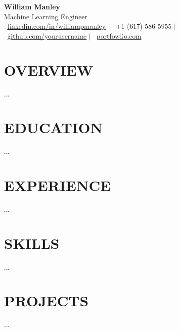 \documentclass[11pt,a4paper]{article}
\begin{document}
\begin{center}
  {\Huge \textbf{William Manley}} \\[0.2cm]
  {\large Machine Learning Engineer} \\[0.3cm]
  \faLinkedin\ \href{https://linkedin.com/in/williampmanley
  }{linkedin.com/in/williampmanley} $|$
  \faPhone\ +1 (617) 586-5955 $|$
  \faGithub\ \href{https://github.com/yourusername}{github.com/yourusername} $|$
  \faGlobe\ \href{https://trained-by-will.com}{portfowlio.com}
\end{center}

\section{OVERVIEW}

...

\section{EDUCATION}

...

\section{EXPERIENCE}

...

\section{SKILLS}

...

\section{PROJECTS}

...
\end{document}
